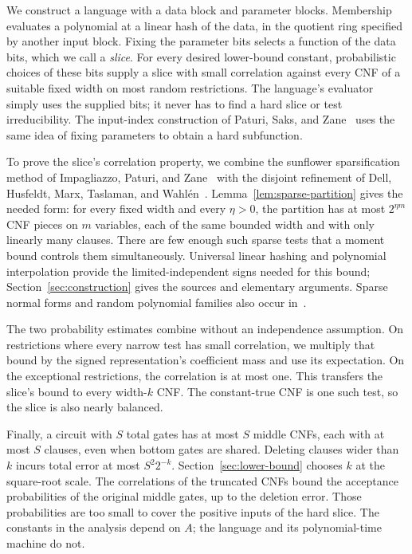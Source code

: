 We construct a language with a data block and parameter blocks.
Membership evaluates a polynomial at a linear hash of the data, in the
quotient ring specified by another input block.  Fixing the parameter
bits selects a function of the data bits, which we call a \emph{slice}.
For every desired lower-bound constant, probabilistic choices of these
bits supply a slice with small correlation against every CNF of a
suitable fixed width on most random restrictions.  The language's evaluator simply
uses the supplied bits; it never has to find a hard slice or test
irreducibility.  The input-index construction of Paturi, Saks, and
Zane~\cite[Section~5]{PSZ00} uses the same idea of fixing parameters
to obtain a hard subfunction.

To prove the slice's correlation property, we combine the sunflower
sparsification method of Impagliazzo, Paturi, and Zane~\cite[Section~2]{IPZ01}
with the disjoint refinement of Dell, Husfeldt, Marx, Taslaman, and
Wahl\'en~\cite[Appendix~A of the full version]{DHMTW14}.
Lemma~\ref{lem:sparse-partition} gives the needed form: for every fixed
width and every \(\eta>0\), the partition has
at most \(2^{\eta m}\) CNF pieces on \(m\) variables, each of the same
bounded width and with only linearly many clauses.  There are few enough
such sparse tests that a moment
bound controls them simultaneously.  Universal linear hashing and
polynomial interpolation provide the limited-independent signs needed
for this bound; Section~\ref{sec:construction} gives the sources and
elementary arguments.  Sparse normal forms and random polynomial
families also occur in~\cite[Section~1.2]{IPZ01}.

The two probability estimates combine without an independence
assumption.  On restrictions where every narrow test has small
correlation, we multiply that bound by the signed representation's
coefficient mass and use its expectation.  On the exceptional
restrictions, the correlation is at most one.  This transfers the
slice's bound to every width-\(k\) CNF.
The constant-true CNF is one such test, so the slice is also nearly
balanced.

Finally, a circuit with \(S\) total gates has at most \(S\) middle CNFs,
each with at most \(S\) clauses, even when bottom gates are shared.
Deleting clauses wider than \(k\) incurs total error at most
\(S^2 2^{-k}\).  Section~\ref{sec:lower-bound} chooses \(k\) at the
square-root scale.  The correlations of the truncated CNFs bound the
acceptance probabilities of the original middle gates, up to the
deletion error.  Those probabilities are too small to cover the
positive inputs of the hard slice.  The constants in the
analysis depend on \(A\); the language and its polynomial-time machine
do not.
